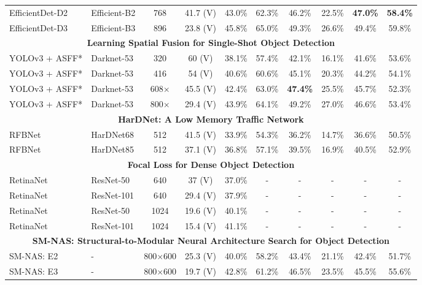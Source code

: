 \documentclass[10pt,twocolumn,letterpaper]{article}
\begin{document}
\begin{table*}[h]
\begin{threeparttable}[h]
\begin{tabular}{llcccccccc}
			\rowcolor{cyan}EfficientDet-D2 & Efficient-B2 & 768 & 41.7 (V) & 43.0\% & 62.3\% & 46.2\% & 22.5\% & \textbf{47.0\%} & \textbf{58.4\%} \\
			EfficientDet-D3 & Efficient-B3 & 896 & 23.8 (V) & 45.8\% & 65.0\% & 49.3\% & 26.6\% & 49.4\% & 59.8\% \\
			\midrule
			\multicolumn{10}{c}{\textbf{Learning Spatial Fusion for Single-Shot Object Detection \cite{liu2019learning}}} \\
			\rowcolor{cyan}YOLOv3 + ASFF* & Darknet-53 & 320 & 60 (V) & 38.1\% & 57.4\% & 42.1\% & 16.1\% & 41.6\% & 53.6\% \\
			\rowcolor{cyan}YOLOv3 + ASFF* & Darknet-53 & 416 & 54 (V) & 40.6\% & 60.6\% & 45.1\% & 20.3\% & 44.2\% & 54.1\% \\
			\rowcolor{cyan}YOLOv3 + ASFF* & Darknet-53 & 608$\times$ & 45.5 (V) & 42.4\% & 63.0\% & \textbf{47.4\%} & 25.5\% & 45.7\% & 52.3\% \\
			YOLOv3 + ASFF* & Darknet-53 & 800$\times$ & 29.4 (V) & 43.9\% & 64.1\% & 49.2\% & 27.0\% & 46.6\% & 53.4\% \\
			\midrule
			\multicolumn{10}{c}{\textbf{HarDNet: A Low Memory Traffic Network} \cite{chao2019hardnet}} \\
			\rowcolor{cyan}RFBNet & HarDNet68 & 512 & 41.5 (V) & 33.9\% & 54.3\% & 36.2\% & 14.7\% & 36.6\% & 50.5\% \\
			\rowcolor{cyan}RFBNet & HarDNet85 & 512 & 37.1 (V) & 36.8\% & 57.1\% & 39.5\% & 16.9\% & 40.5\% & 52.9\% \\
			\midrule
			\multicolumn{10}{c}{\textbf{Focal Loss for Dense Object Detection} \cite{lin2017focal}} \\
			\rowcolor{cyan}RetinaNet & ResNet-50 & 640 & 37 (V) & 37.0\% & - & - & - & - & - \\
			RetinaNet & ResNet-101 & 640 & 29.4 (V) & 37.9\% & - & - & - & - & - \\
			RetinaNet & ResNet-50 & 1024 & 19.6 (V) & 40.1\% & - & - & - & - & - \\
			RetinaNet & ResNet-101 & 1024 & 15.4 (V) & 41.1\% & - & - & - & - & - \\
			\midrule
			\midrule
			\multicolumn{10}{c}{\textbf{SM-NAS: Structural-to-Modular Neural Architecture Search for Object Detection \cite{yao2019sm}}} \\
			SM-NAS: E2 & - & 800$\times$600 & 25.3 (V) & 40.0\% & 58.2\% & 43.4\% & 21.1\% & 42.4\% & 51.7\% \\
			SM-NAS: E3 & - & 800$\times$600 & 19.7 (V) & 42.8\% & 61.2\% & 46.5\% & 23.5\% & 45.5\% & 55.6\% \\

\end{tabular}
\end{threeparttable}
\end{table*}
\end{document}

